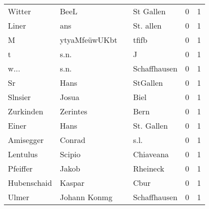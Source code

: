 \begin{tabular}{llllrr}
                   Witter &                               BeeL &             &                                   St Gallen &          0 &         1 \\
                    Liner &                                ans &             &                                   St. allen &          0 &         1 \\
                        M &                      ytyaMfeüwUKbt &             &                                       tfifb &          0 &         1 \\
                        t &                               s.n. &             &                                           J &          0 &         1 \\
                     w... &                               s.n. &             &                                Schaffhausen &          0 &         1 \\
                       Sr &                               Hans &             &                                    StGallen &          0 &         1 \\
                  Slnsier &                              Josua &             &                                        Biel &          0 &         1 \\
                Zurkinden &                           Zerintes &             &                                        Bern &          0 &         1 \\
                    Einer &                               Hans &             &                                  St. Gallen &          0 &         1 \\
                Amisegger &                             Conrad &             &                                        s.l. &          0 &         1 \\
                 Lentulus &                             Scipio &             &                                   Chiaveana &          0 &         1 \\
                 Pfeiffer &                              Jakob &             &                                    Rheineck &          0 &         1 \\
              Hubenschaid &                             Kaspar &             &                                        Cbur &          0 &         1 \\
                    Ulmer &                       Johann Konmg &             &                                Schaffhausen &          0 &         1 \\

\end{tabular}
